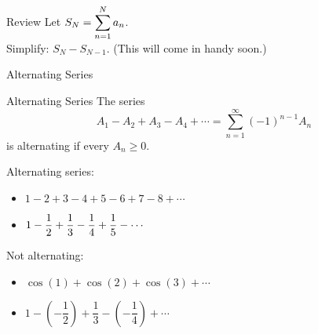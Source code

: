 \begin{frame}[t]{Review}
\AnswerSpace
{}
Let $\displaystyle S_N=\sum_{n=1}^N a_n$.\\[1em]

Simplify:  $S_{N}-S_{N-1}$.
\hfill
(This will come in handy soon.)


\vfill

\end{frame}
\begin{frame}[t]{Alternating Series}

\begin{block}{Alternating Series}
The series
\begin{equation*}
A_1-A_2+A_3-A_4+\cdots =\sum_{n=1}^\infty (-1)^{n-1} A_n
\end{equation*}
is alternating if every $A_n\ge 0$.
\end{block}

\begin{multicols}{2}
Alternating series:\\[2em]
\begin{itemize}
\item $1-2+3-4+5-6+7-8+\cdots$\\[1em]
\item $\displaystyle 1-\frac12+\frac13-\frac14+\frac15-\cdots$
\end{itemize}
\columnbreak

Not alternating:\\[2em]
\begin{itemize}
\item $\cos(1)+\cos(2)+\cos(3)+\cdots$
\item $1-\left(-\dfrac12\right)+\dfrac13-\left(-\dfrac14\right)+\cdots$
\end{itemize}
\end{multicols}
\end{frame}

